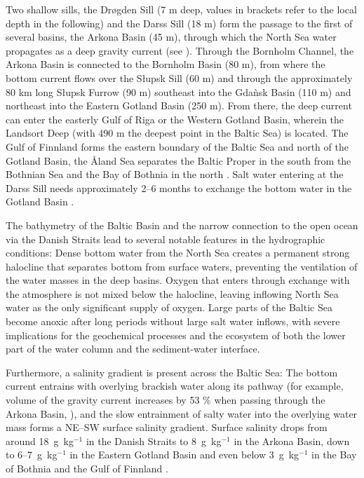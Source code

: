 Two shallow sills, the Dr\o gden Sill (7 m deep, values in brackets refer to the 
local depth in the following) and the Darss Sill (18 m) form the passage to the 
first of several basins, the Arkona Basin (45 m), 
through which the North Sea water propagates as a deep gravity current 
(see ). Through 
the Bornholm Channel, the Arkona Basin is connected to the Bornholm Basin (80 
m), from where the bottom current flows over the S\l upsk Sill (60 m) and 
through the approximately 80 km long S\l upsk Furrow (90 m) southeast into the 
Gda\`{n}sk Basin (110 m) and northeast into the Eastern Gotland Basin (250 m). 
From there, the deep current can enter the easterly Gulf of Riga or the Western 
Gotland Basin, wherein the Landsort Deep (with 490 m the deepest point in the 
Baltic Sea) is located. The Gulf of Finnland forms the eastern boundary of the 
Baltic Sea and north of the Gotland Basin, the \r{A}land Sea separates the 
Baltic Proper in the south from the Bothnian Sea and the Bay of Bothnia in the 
north \citep[][]{reissmann2009}. Salt water entering at the Darss Sill needs 
approximately 2--6 months to exchange the bottom water in the Gotland Basin 
\citep[][]{balticsea}.

The bathymetry of the Baltic Basin and the narrow connection to the 
open ocean via the Danish Straits lead to several notable features in the 
hydrographic conditions: Dense bottom water from the North Sea 
creates a permanent strong halocline that separates bottom from surface waters, 
preventing the ventilation of the water masses in the deep basins. Oxygen that 
enters through exchange with the atmosphere is not mixed below the halocline, 
leaving inflowing North Sea water as the only significant supply of oxygen. 
Large parts 
of the Baltic Sea become anoxic after long periods without large salt 
water inflows, with severe implications for the geochemical processes and the 
ecosystem of both the lower part of the water column and the sediment-water 
interface. 

Furthermore, a salinity gradient is present across the Baltic Sea: The bottom 
current entrains with overlying brackish water along its pathway (for 
example, volume of the gravity current increases by 53 \% when passing through 
the Arkona Basin, \citep[see][]{reissmann2009}), and the slow entrainment of 
salty water into the overlying water mass forms a NE--SW surface salinity 
gradient. Surface salinity drops from around 18~g~kg$^{-1}$ in the Danish 
Straits to 8~g~kg$^{-1}$ in the Arkona Basin, down to 6--7~g~kg$^{-1}$ in the 
Eastern Gotland Basin and even below 3~g~kg$^{-1}$ in the Bay of Bothnia and the 
Gulf of Finnland \citep[][]{balticsea}.

